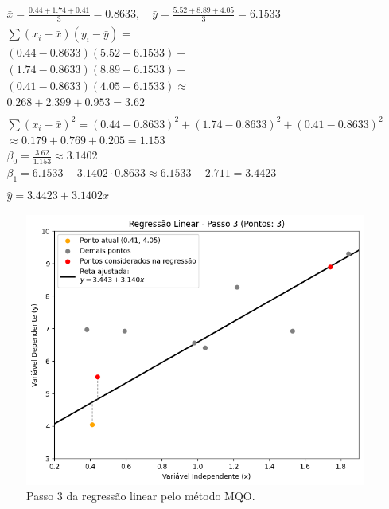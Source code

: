 \begin{gather*}
	\bar{x} = \frac{0.44 + 1.74 + 0.41}{3} = 0.8633, \quad \bar{y} = \frac{5.52 + 8.89 + 4.05}{3} = 6.1533 \\
	\sum (x_i - \bar{x})(y_i - \bar{y}) = \\ 
	(0.44 - 0.8633)(5.52 - 6.1533) + \\
	(1.74 - 0.8633)(8.89 - 6.1533) + \\
	(0.41 - 0.8633)(4.05 - 6.1533) \approx  \\
	0.268 + 2.399 + 0.953 = 3.62 \\ \\
	\sum (x_i - \bar{x})^2 = (0.44 - 0.8633)^2 + (1.74 - 0.8633)^2 + (0.41 - 0.8633)^2 \\
	\approx 0.179 + 0.769 + 0.205 = 1.153 \\
	\beta_0 = \frac{3.62}{1.153} \approx 3.1402 \\
	\beta_1 = 6.1533 - 3.1402 \cdot 0.8633 \approx 6.1533 - 2.711 = 3.4423 \\ \\
	\hat{y} = 3.4423 + 3.1402x
\end{gather*}

\begin{figure}[H]
	\caption{\label{fig:mqo_2}Passo 3 da regressão linear pelo método MQO.}
	\begin{center}
		\includegraphics[scale=0.5]{figuras/RL_step_3.png}
	\end{center}
\end{figure}

